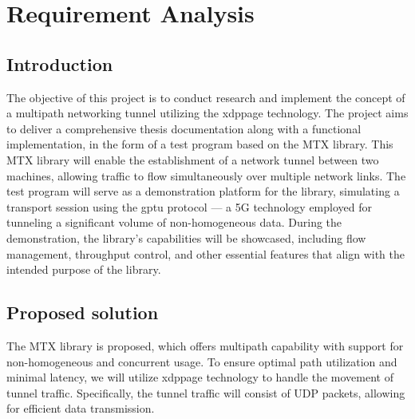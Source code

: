 \chapter{Requirement Analysis}\label{sec:reqs}\minitoc\vspace{.5cm}

\section{Introduction}
The objective of this project is to conduct research and implement the concept of a multipath networking tunnel utilizing the \ac{xdppage} technology. The project aims to deliver a comprehensive thesis documentation along with a functional implementation, in the form of a test program based on the \ac{MTX} library.
This \ac{MTX} library will enable the establishment of a network tunnel between two machines, allowing traffic to flow simultaneously over multiple network links. 
The test program will serve as a demonstration platform for the library, simulating a transport session using the \ac{gptu} protocol — a 5G technology employed for tunneling a significant volume of non-homogeneous data.
During the demonstration, the library's capabilities will be showcased, including flow management, throughput control, and other essential features that align with the intended purpose of the library.



\section{Proposed solution}\label{sec:reqs:proposed_solution}
The MTX library is proposed, which offers multipath capability with support for non-homogeneous and concurrent usage.
To ensure optimal path utilization and minimal latency, we will utilize \ac{xdppage} technology to handle the movement of tunnel traffic. 
Specifically, the tunnel traffic will consist of UDP packets, allowing for efficient data transmission.

